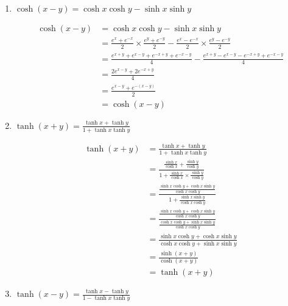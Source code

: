\documentclass[12pt]{article}
\begin{document}
\begin{enumerate}
\item $\displaystyle\cosh(x-y)=\cosh{x}\cosh{y}-\sinh{x}\sinh{y}$

\begin{equation*}
  \begin{aligned}
  \cosh(x-y)&=\cosh{x}\cosh{y}-\sinh{x}\sinh{y}\\
  &=\frac{e^x+e^{-x}}{2}\times\frac{e^y+e^{-y}}{2}-\frac{e^x-e^{-x}}{2}\times\frac{e^y-e^{-y}}{2}\\
  &=\frac{e^{x+y}+e^{x-y}+e^{-x+y}+e^{-x-y}}{4}-\frac{e^{x+y}-e^{x-y}-e^{-x+y}+e^{-x-y}}{4}\\
  &=\frac{2e^{x-y}+2e^{-x+y}}{4}\\
  &=\frac{e^{x-y}+e^{-(x-y)}}{2}\\
  &=\cosh(x-y)
  \end{aligned}
\end{equation*}

\item $\displaystyle\tanh(x+y)=\frac{\tanh{x}+\tanh{y}}{1+\tanh{x}\tanh{y}}$

\begin{equation*}
  \begin{aligned}
  \tanh(x+y)&=\frac{\tanh{x}+\tanh{y}}{1+\tanh{x}\tanh{y}}\\
  &=\frac{\frac{\sinh{x}}{\cosh{x}}+\frac{\sinh{y}}{\cosh{y}}}{1+\frac{\sinh{x}}{\cosh{x}}\times\frac{\sinh{y}}{\cosh{y}}}\\
  &=\frac{\frac{\sinh{x}\cosh{y}+\cosh{x}\sinh{y}}{\cosh{x}\cosh{y}}}{1+\frac{\sinh{x}\sinh{y}}{\cosh{x}\cosh{y}}}\\
  &=\frac{\frac{\sinh{x}\cosh{y}+\cosh{x}\sinh{y}}{\cosh{x}\cosh{y}}}{\frac{\cosh{x}\cosh{y}+\sinh{x}\sinh{y}}{\cosh{x}\cosh{y}}}\\
  &=\frac{\sinh{x}\cosh{y}+\cosh{x}\sinh{y}}{\cosh{x}\cosh{y}+\sinh{x}\sinh{y}}\\
  &=\frac{\sinh(x+y)}{\cosh(x+y)}\\
  &=\tanh(x+y)
  \end{aligned}
\end{equation*}

\item $\displaystyle\tanh(x-y)=\frac{\tanh{x}-\tanh{y}}{1-\tanh{x}\tanh{y}}$


\end{enumerate}
\end{document}
